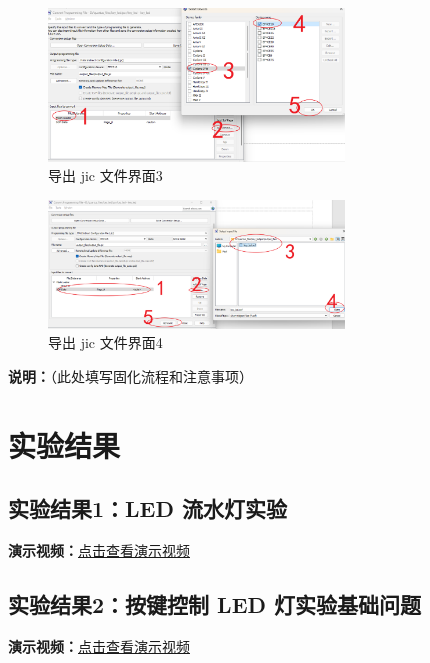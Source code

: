 \documentclass[UTF8]{article}
\theoremstyle{MyLineTheoremStyle} %
\theoremstyle{MyBlockTheoremStyle} %
\theoremstyle{MySubsubsectionStyle} %
\begin{document}
\begin{enumerate}
    \begin{figure}[H]
        \centering
        \includegraphics[width=0.7\textwidth]{step10_3.png}
        \caption{导出 jic 文件界面3}
        \label{fig:step10_3}
    \end{figure}

    \begin{figure}[H]
        \centering
        \includegraphics[width=0.7\textwidth]{step10_4.png}
        \caption{导出 jic 文件界面4}
        \label{fig:step10_4}
    \end{figure}

    \textbf{说明：}（此处填写固化流程和注意事项）
\end{enumerate}




\cleardoublepage

\section{实验结果}

\subsection{实验结果1：LED 流水灯实验}
\noindent
\textbf{演示视频：}\href{https://www.bilibili.com/video/BV1H1VtzYEMq/?share_source=copy_web&vd_source=4fd6c4265e65c0785c912874692a3971}{点击查看演示视频}

\subsection{实验结果2：按键控制 LED 灯实验基础问题}
\noindent
\textbf{演示视频：}\href{https://www.bilibili.com/video/BV1c1VtzYEpA/?share_source=copy_web&vd_source=4fd6c4265e65c0785c912874692a3971}{点击查看演示视频}
\end{document}
